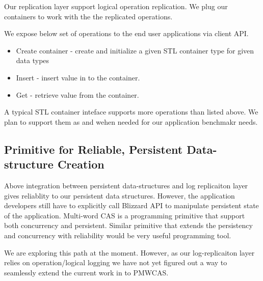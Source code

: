 Our replication layer support logical operation replication. We plug our containers to work with
the the replicated operations. 

We expose below set of operations to the end user applications via client API.

\begin{itemize}
\item Create container - create and initialize a given STL container type for given data types
\item Insert - insert value in to the container.
\item Get - retrieve value from the container.
\end{itemize}

A typical STL container inteface supports more operations than listed above. We plan to support them
as and wehen needed for our application benchmakr needs.

\subsection{Primitive for Reliable, Persistent Data-structure Creation}

Above integration between persistent data-structures and log replicaiton layer
gives reliablity to our persistent data structures. However, the application developers 
still have to explicitly call Blizzard API to manipulate persistent state of the application.
Multi-word CAS is a programming primitive that support both concurrency and persistent. Similar
primitive that extends the persistency and concurrency with reliability would be very useful
programming tool.

We are exploring this path at the moment. However, as our log-replicaiton layer relies on operation/logical
logging we have not yet figured out a way to seamlessly extend the current work in to PMWCAS.




